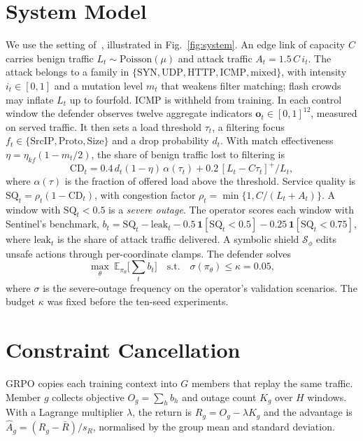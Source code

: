 \documentclass[journal]{IEEEtran}
\begin{document}
\section{System Model}

We use the setting of~\cite{alfatemi2026sentinel}, illustrated in Fig.~\ref{fig:system}. An edge link of capacity $C$ carries benign traffic $L_t\sim\mathrm{Poisson}(\mu)$ and attack traffic $A_t=1.5\,C\,i_t$. The attack belongs to a family in $\{\mathrm{SYN},\mathrm{UDP},\mathrm{HTTP},\mathrm{ICMP},\mathrm{mixed}\}$, with intensity $i_t\in[0,1]$ and a mutation level $m_t$ that weakens filter matching; flash crowds may inflate $L_t$ up to fourfold. ICMP is withheld from training. In each control window the defender observes twelve aggregate indicators $\mathbf{o}_t\in[0,1]^{12}$, measured on served traffic. It then sets a load threshold $\tau_t$, a filtering focus $f_t\in\{\mathrm{SrcIP},\mathrm{Proto},\mathrm{Size}\}$ and a drop probability $d_t$. With match effectiveness $\eta=\eta_{kf}(1-m_t/2)$, the share of benign traffic lost to filtering is
\begin{equation}
\mathrm{CD}_t = 0.4\,d_t(1-\eta)\,\alpha(\tau_t) + 0.2\,[L_t-C\tau_t]^+/L_t ,
\label{eq:cd}
\end{equation}
where $\alpha(\tau)$ is the fraction of offered load above the threshold. Service quality is $\mathrm{SQ}_t=\rho_t(1-\mathrm{CD}_t)$, with congestion factor $\rho_t=\min\{1,C/(L_t+A_t)\}$. A window with $\mathrm{SQ}_t<0.5$ is a \emph{severe outage}. The operator scores each window with Sentinel's benchmark,
$b_t=\mathrm{SQ}_t-\mathrm{leak}_t-0.5\,\mathbf{1}[\mathrm{SQ}_t<0.5]-0.25\,\mathbf{1}[\mathrm{SQ}_t<0.75]$,
where $\mathrm{leak}_t$ is the share of attack traffic delivered. A symbolic shield $\mathcal{S}_\phi$ edits unsafe actions through per-coordinate clamps. The defender solves
\begin{equation}
\max_\theta\ \mathbb{E}_{\pi_\theta}\Big[\textstyle\sum_t b_t\Big]\quad\text{s.t.}\quad \sigma(\pi_\theta)\le\kappa=0.05 ,
\label{eq:cpomdp}
\end{equation}
where $\sigma$ is the severe-outage frequency on the operator's validation scenarios. The budget $\kappa$ was fixed before the ten-seed experiments.

\section{Constraint Cancellation}
\label{sec:mechanism}
GRPO copies each training context into $G$ members that replay the same traffic. Member $g$ collects objective $O_g=\sum_h b_h$ and outage count $K_g$ over $H$ windows. With a Lagrange multiplier $\lambda$, the return is $R_g=O_g-\lambda K_g$ and the advantage is $\hat A_g=(R_g-\bar R)/s_R$, normalised by the group mean and standard deviation.
\end{document}
